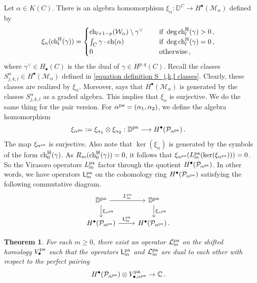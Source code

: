 \documentclass[11pt]{amsart}
\newtheorem{theorem}{Theorem}
\theoremstyle{remark}
\newcommand{\C}{\mathbb{C}}
\renewcommand{\P}{\mathcal{P}}
\newcommand{\ch}{{\rm ch}}
\newcommand{\mb}[1]{\mathbb{#1}}
\newcommand{\D}{\mathbb{D}}
\newcommand{\M}{\mathcal{M}}
\newcommand{\W}{\mathcal{W}}
\newcommand{\pa}[0]{\textnormal{pa}}
\renewcommand{\L}[0]{\mathcal L}
\newcommand{\chh}[0]{\textnormal{ch}^\textnormal{H}}
\newcommand{\mL}{\mathsf{L}}
\numberwithin{theorem}{section}
\begin{document}
Let $\alpha \in K(C)$.
There is an algebra homomorphism
$\xi_\alpha : \D^C \to H^\bullet(\M_\alpha)$
defined by
$$ \xi_\alpha(\chh_l(\gamma)) = 
\begin{cases}
    \ch_{l+1-p}(\W_\alpha) \setminus \gamma^\vee \quad & 
    \text{ if } \deg \chh_l(\gamma)>0\,,\\
    \int_{C} \gamma \cdot \ch(\alpha) & 
    \text{ if } \deg \chh_l(\gamma)=0\,, \\
    0 &\text{ otherwise}\,,
\end{cases}$$
where $\gamma^\vee \in H_\bullet(C)$ is the the dual of $\gamma \in H^{p,q}(C)$.
Recall the classes $S^\alpha_{j,k,l} \in H^\bullet(\M_\alpha)$ defined in \eqref{equation definition S_j,k,l classes}.
Clearly, these classes are realized by $\xi_\alpha$.
Moreover, \cite[Theorem 4.15]{gros20} says 
that $H^\bullet(\M_\alpha)$ is generated by the classes
$S^\alpha_{j,k,l}$ as a graded algebra.
This implies that $\xi_\alpha$ is surjective.
We do the same thing for the pair version.
For $\alpha^\pa = (\alpha_1,\alpha_2)$, we define
the algebra homomorphism
$$\xi_{\alpha^\pa} := \xi_{\alpha_1} \otimes \xi_{\alpha_2}: 
\D^\pa \longrightarrow H^\bullet(\P_{\alpha^\pa})\,.$$
The map $\xi_{\alpha^\pa}$ is surjective.
Also note that $\ker(\xi_\alpha)$ is generated by the symbols of the form
$\chh_0(\gamma)$.
As $R_m(\chh_0(\gamma))=0$,
it follows that $\xi_{\alpha^\pa}(L^\pa_m(\ker(\xi_{\alpha^\pa})))=0$.
So the Virasoro operators $L^\pa_m$ factor through the quotient 
$H^\bullet(\P_{\alpha^\pa})$.
In other words, we have operators $\mL^\pa_m$ on the cohomology ring $H^\bullet(\P_{\alpha^\pa})$ satisfying the following commutative diagram.
$$
    \begin{tikzcd}
    \D^\pa \arrow[r,"L^\pa_m"] \arrow[d,"\xi_{\alpha^\pa}"] & \D^\pa \arrow[d,"\xi_{\alpha^\pa}"]\\   
    H^\bullet(\P_{\alpha^\pa}) \arrow[r,"\mL^\pa_m"]& H^\bullet(\P_{\alpha^\pa}) \,.
\end{tikzcd}
$$
\begin{theorem}\label{theorem virasoro conformal}
     For each $m \geqslant 0$, there exist an operator $\L_m^\pa $ on the shifted homology $V^\pa_\bullet$ such that 
    the operators $\mL_m^\pa$ and $\L_m^\pa$ are dual to each other with respect to the perfect pairing 
    $$H^\bullet(\P_{\alpha^\pa}) \otimes V^\pa_{\bullet,\alpha^\pa} \to \C \,.$$
\end{theorem}
\end{document}
